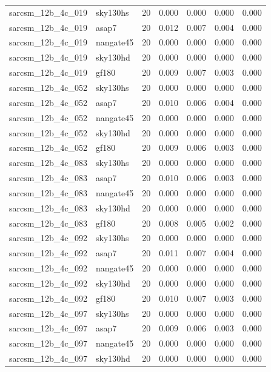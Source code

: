 \begin{tabular}{llrrrrr}
sarcsm\_12b\_4c\_019 & sky130hs & 20 & 0.000 & 0.000 & 0.000 & 0.000 \\
sarcsm\_12b\_4c\_019 & asap7 & 20 & 0.012 & 0.007 & 0.004 & 0.000 \\
sarcsm\_12b\_4c\_019 & nangate45 & 20 & 0.000 & 0.000 & 0.000 & 0.000 \\
sarcsm\_12b\_4c\_019 & sky130hd & 20 & 0.000 & 0.000 & 0.000 & 0.000 \\
sarcsm\_12b\_4c\_019 & gf180 & 20 & 0.009 & 0.007 & 0.003 & 0.000 \\
sarcsm\_12b\_4c\_052 & sky130hs & 20 & 0.000 & 0.000 & 0.000 & 0.000 \\
sarcsm\_12b\_4c\_052 & asap7 & 20 & 0.010 & 0.006 & 0.004 & 0.000 \\
sarcsm\_12b\_4c\_052 & nangate45 & 20 & 0.000 & 0.000 & 0.000 & 0.000 \\
sarcsm\_12b\_4c\_052 & sky130hd & 20 & 0.000 & 0.000 & 0.000 & 0.000 \\
sarcsm\_12b\_4c\_052 & gf180 & 20 & 0.009 & 0.006 & 0.003 & 0.000 \\
sarcsm\_12b\_4c\_083 & sky130hs & 20 & 0.000 & 0.000 & 0.000 & 0.000 \\
sarcsm\_12b\_4c\_083 & asap7 & 20 & 0.010 & 0.006 & 0.003 & 0.000 \\
sarcsm\_12b\_4c\_083 & nangate45 & 20 & 0.000 & 0.000 & 0.000 & 0.000 \\
sarcsm\_12b\_4c\_083 & sky130hd & 20 & 0.000 & 0.000 & 0.000 & 0.000 \\
sarcsm\_12b\_4c\_083 & gf180 & 20 & 0.008 & 0.005 & 0.002 & 0.000 \\
sarcsm\_12b\_4c\_092 & sky130hs & 20 & 0.000 & 0.000 & 0.000 & 0.000 \\
sarcsm\_12b\_4c\_092 & asap7 & 20 & 0.011 & 0.007 & 0.004 & 0.000 \\
sarcsm\_12b\_4c\_092 & nangate45 & 20 & 0.000 & 0.000 & 0.000 & 0.000 \\
sarcsm\_12b\_4c\_092 & sky130hd & 20 & 0.000 & 0.000 & 0.000 & 0.000 \\
sarcsm\_12b\_4c\_092 & gf180 & 20 & 0.010 & 0.007 & 0.003 & 0.000 \\
sarcsm\_12b\_4c\_097 & sky130hs & 20 & 0.000 & 0.000 & 0.000 & 0.000 \\
sarcsm\_12b\_4c\_097 & asap7 & 20 & 0.009 & 0.006 & 0.003 & 0.000 \\
sarcsm\_12b\_4c\_097 & nangate45 & 20 & 0.000 & 0.000 & 0.000 & 0.000 \\
sarcsm\_12b\_4c\_097 & sky130hd & 20 & 0.000 & 0.000 & 0.000 & 0.000 \\

\end{tabular}
